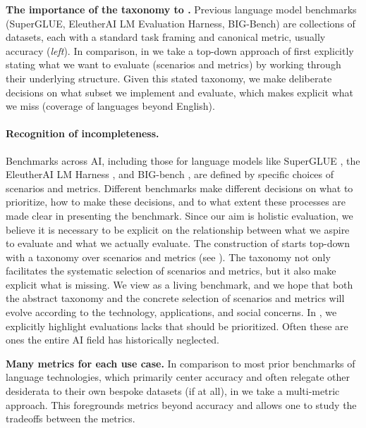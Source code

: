 {\textbf{The importance of the taxonomy to \benchmarkname.}
Previous language model benchmarks (\eg SuperGLUE, EleutherAI LM Evaluation Harness, BIG-Bench) are collections of datasets, each with a standard task framing and canonical metric, usually accuracy (\textit{left}).
In comparison, in \benchmarkname we take a top-down approach of first explicitly stating what we want to evaluate (\ie scenarios and metrics) by working through their underlying structure.
Given this stated taxonomy, we make deliberate decisions on what subset we implement and evaluate, which makes explicit what we miss (\eg coverage of languages beyond English).}

\paragraph{Recognition of incompleteness.}
Benchmarks across AI, including those for language models like SuperGLUE \citep{wang2019superglue}, the EleutherAI LM Harness \citep{gao2021harness}, and BIG-bench \citep{srivastava2022bigbench}, are defined by specific choices of scenarios and metrics.
Different benchmarks make different decisions on what to prioritize, how to make these decisions, and to what extent these processes are made clear in presenting the benchmark.
Since our aim is holistic evaluation, we believe it is necessary to be explicit on the relationship between what we aspire to evaluate and what we actually evaluate.
The construction of \benchmarkname starts top-down with a taxonomy over scenarios and metrics (see ).
The taxonomy not only facilitates the systematic selection of scenarios and metrics, but it also make explicit what is missing.
We view \benchmarkname as a living benchmark,
and we hope that both the abstract taxonomy and the concrete selection of scenarios and metrics will evolve according to the technology, applications, and social concerns.
In , we explicitly highlight evaluations \benchmarkname lacks that should be prioritized.  Often these are ones the entire AI field has historically neglected.

{\textbf{Many metrics for each use case.}
In comparison to most prior benchmarks of language technologies, which primarily center accuracy and often relegate other desiderata to their own bespoke datasets (if at all), in \benchmarkname we take a multi-metric approach.
This foregrounds metrics beyond accuracy and allows one to study the tradeoffs between the metrics.
}

